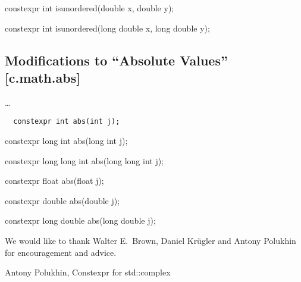 \documentclass[prd,twocolumn,amsmath,amssymb,nofootinbib,eqsecnum]{revtex4-1}
\newcommand{\code}[1]{{\tt #1}}
\newcommand{\highlight}[1]{{\color{red} #1}}
\begin{document}
\begin{widetext}
{\highlight{constexpr} int isunordered(double x, double y);

\highlight{constexpr} int isunordered(long double x, long double y);
}

\subsection{Modifications to  ``Absolute Values''  [c.math.abs]}

\ldots

\code{
	\highlight{constexpr}  int abs(int j);
	
	\highlight{constexpr} long int abs(long int j);
	
	\highlight{constexpr} long long int abs(long long int j);

	\highlight{constexpr} float abs(float j);
	
	\highlight{constexpr}  double abs(double j);

	\highlight{constexpr} long double abs(long double j);
}


\end{widetext}

\begin{acknowledgments}
	We would like to thank Walter E.~Brown, Daniel Kr\"ugler and Antony Polukhin for 
	encouragement and advice.
\end{acknowledgments}

\begin{thebibliography}{1}
	 Antony Polukhin, Constexpr for std::complex
\end{thebibliography}
\end{document}
